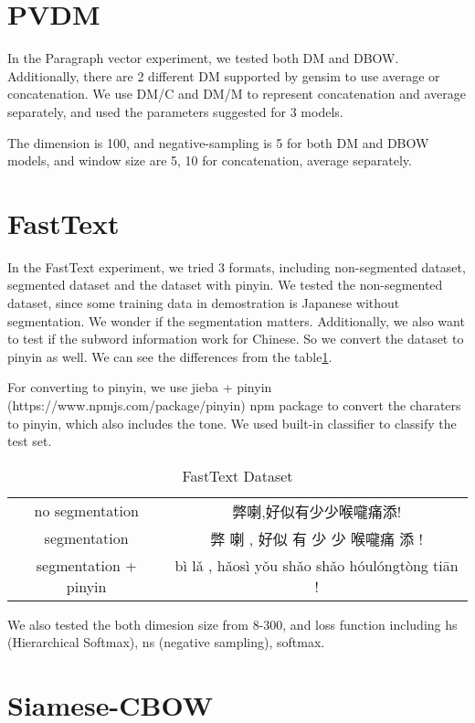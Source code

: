 \section{PVDM}

In the Paragraph vector experiment, we tested both DM and DBOW. Additionally, there are 2 different DM supported by gensim to use average or concatenation.
We use DM/C and DM/M to represent concatenation and average separately, and used the parameters suggested for 3 models. 

The dimension is 100, and negative-sampling is 5 for both DM and DBOW models, and window size are 5, 10 for concatenation, average separately. 

\section{FastText}

In the FastText experiment, we tried 3 formats, including non-segmented dataset, segmented dataset and the dataset with pinyin.
We tested the non-segmented dataset, since some training data in demostration is Japanese without segmentation. We wonder if the segmentation matters.
Additionally, we also want to test if the subword information work for Chinese. So we convert the dataset to pinyin as well. We can see the differences from the table\ref{ftdataset}.

For converting to pinyin, we use jieba + pinyin (https://www.npmjs.com/package/pinyin) npm package to convert the  charaters to pinyin, which also includes the tone.
We used built-in classifier to classify the test set.

\begin{table}[]
\centering
\caption{FastText Dataset}
\label{ftdataset}
\begin{tabular}{|c|c|}
\hline
   & \\
\hline
no segmentation  & 弊喇,好似有少少喉嚨痛添! \\
segmentation  & 弊 喇 , 好似 有 少 少 喉嚨痛 添 ! \\
segmentation + pinyin  & bì lǎ , hǎosì yǒu shǎo shǎo hóulóngtòng tiān ! \\
\hline
\end{tabular}
\end{table}

We also tested the both dimesion size from 8-300, and loss function including hs (Hierarchical Softmax), ns (negative sampling), softmax.


\section{Siamese-CBOW}

